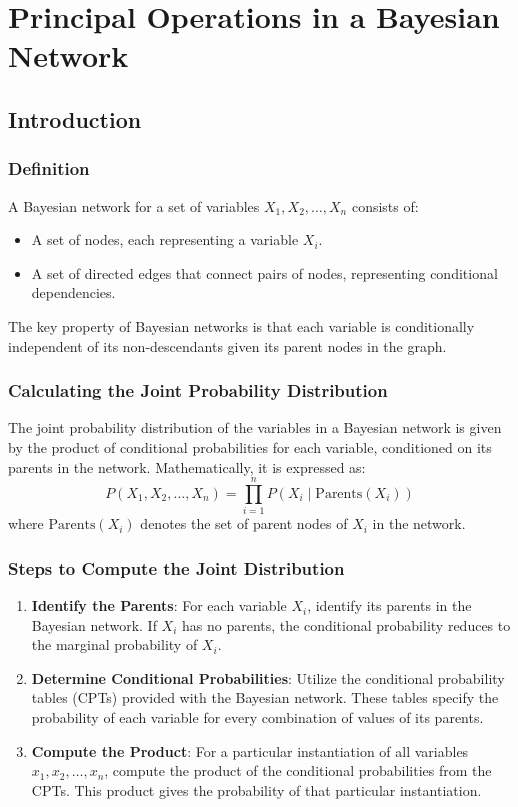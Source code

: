 \section{Principal Operations in a Bayesian Network}

\subsection{Introduction}
\subsubsection{Definition}
A Bayesian network for a set of variables $X_1, X_2, \ldots, X_n$ consists of:
\begin{itemize}
    \item A set of nodes, each representing a variable $X_i$.
    \item A set of directed edges that connect pairs of nodes, representing conditional dependencies.
\end{itemize}
The key property of Bayesian networks is that each variable is conditionally independent of its non-descendants given its parent nodes in the graph.

\subsubsection{Calculating the Joint Probability Distribution}
The joint probability distribution of the variables in a Bayesian network is given by the product of conditional probabilities for each variable, conditioned on its parents in the network. Mathematically, it is expressed as:
\[
P(X_1, X_2, \ldots, X_n) = \prod_{i=1}^n P(X_i \mid \text{Parents}(X_i))
\]
where $\text{Parents}(X_i)$ denotes the set of parent nodes of $X_i$ in the network.

\subsubsection{Steps to Compute the Joint Distribution}
\begin{enumerate}
    \item \textbf{Identify the Parents}: For each variable $X_i$, identify its parents in the Bayesian network. If $X_i$ has no parents, the conditional probability reduces to the marginal probability of $X_i$.
    \item \textbf{Determine Conditional Probabilities}: Utilize the conditional probability tables (CPTs) provided with the Bayesian network. These tables specify the probability of each variable for every combination of values of its parents.
    \item \textbf{Compute the Product}: For a particular instantiation of all variables $x_1, x_2, \ldots, x_n$, compute the product of the conditional probabilities from the CPTs. This product gives the probability of that particular instantiation.
\end{enumerate}

